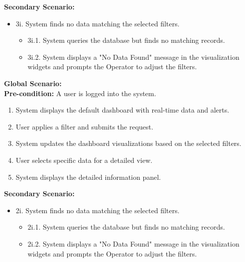{\begin{enumerate}[{\bf BE1.}]
\begin{enumerate}[{\bf VP1.}]
            {\bf Secondary Scenario:}
            \begin{itemize}
                \item[] {3i.} System finds no data matching the selected filters.
                \begin{itemize}
                    \item[] {3i.1.} System queries the database but finds no matching records.
                    \item[] {3i.2.} System displays a "No Data Found" message in the visualization widgets and prompts the Operator to adjust the filters.
                \end{itemize}
            \end{itemize}
    \end{enumerate}
    {\bf Global Scenario:} \\
    {\bf Pre-condition:} A user is logged into the system.
        \begin{enumerate}[1. ]
            \item System displays the default dashboard with real-time data and alerts.
            \item User applies a filter and submits the request.
            \item System updates the dashboard visualizations based on the selected filters.
            \item User selects specific data for a detailed view.
            \item System displays the detailed information panel.
        \end{enumerate}

    {\bf Secondary Scenario:}
        \begin{itemize}
            \item[] {2i.} System finds no data matching the selected filters.
            \begin{itemize}
                \item[] {2i.1.} System queries the database but finds no matching records.
                \item[] {2i.2.} System displays a "No Data Found" message in the visualization widgets and prompts the Operator to adjust the filters.
            \end{itemize}
        \end{itemize}


\end{enumerate}}
